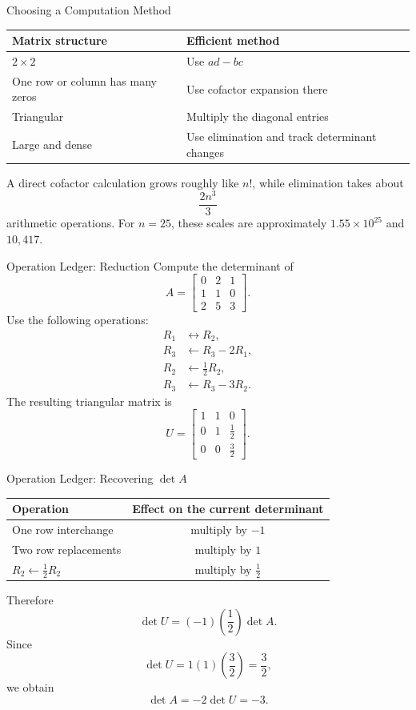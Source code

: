 \begin{frame}{Choosing a Computation Method}
\small
\renewcommand{\arraystretch}{1.35}
\begin{center}
\begin{tabular}{>{\raggedright\arraybackslash}p{.40\linewidth}>{\raggedright\arraybackslash}p{.48\linewidth}}
\toprule
Matrix structure & Efficient method \\
\midrule
$2\times2$ & Use $ad-bc$ \\
One row or column has many zeros & Use cofactor expansion there \\
Triangular & Multiply the diagonal entries \\
Large and dense & Use elimination and track determinant changes \\
\bottomrule
\end{tabular}
\end{center}
\pause
A direct cofactor calculation grows roughly like $n!$, while elimination takes about
\[
\frac{2n^3}{3}
\]
arithmetic operations. For $n=25$, these scales are approximately $1.55\times10^{25}$ and $10{,}417$.
\end{frame}

\begin{frame}{Operation Ledger: Reduction}
\small
Compute the determinant of
\[
A=\begin{bmatrix}
0&2&1\\
1&1&0\\
2&5&3
\end{bmatrix}.
\]
Use the following operations:
\[
\begin{aligned}
R_1&\leftrightarrow R_2,\\
R_3&\leftarrow R_3-2R_1,\\
R_2&\leftarrow \tfrac12 R_2,\\
R_3&\leftarrow R_3-3R_2.
\end{aligned}
\]
\pause
The resulting triangular matrix is
\[
U=\begin{bmatrix}
1&1&0\\
0&1&\tfrac12\\
0&0&\tfrac32
\end{bmatrix}.
\]
\end{frame}

\begin{frame}{Operation Ledger: Recovering $\det A$}
\small
\renewcommand{\arraystretch}{1.35}
\begin{center}
\begin{tabular}{lc}
\toprule
Operation & Effect on the current determinant \\
\midrule
One row interchange & multiply by $-1$ \\
Two row replacements & multiply by $1$ \\
$R_2\leftarrow\tfrac12R_2$ & multiply by $\tfrac12$ \\
\bottomrule
\end{tabular}
\end{center}
Therefore
\[
\det U=(-1)\left(\frac12\right)\det A.
\]
\pause
Since
\[
\det U=1(1)\left(\frac32\right)=\frac32,
\]
we obtain
\[
\boxed{\det A=-2\det U=-3}.
\]
\end{frame}

